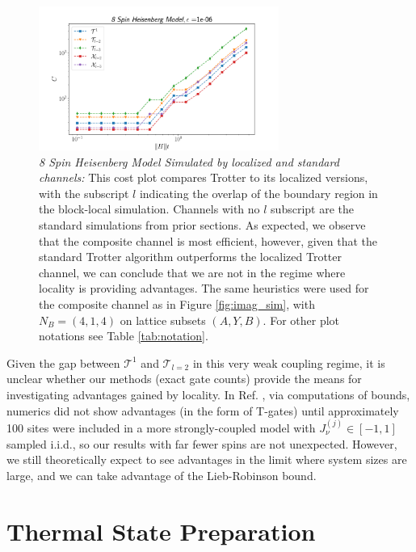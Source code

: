 \begin{figure}[htbp!]
    \centering
    \includegraphics[width=0.7\textwidth]{composite_numerics/local_Heisen8.png}
    \caption{\textit{8 Spin Heisenberg Model Simulated by localized and standard channels:} This cost plot compares Trotter to its  localized versions, with the subscript $l$ indicating the overlap of the boundary region in the block-local simulation.  Channels with no $l$ subscript are the standard simulations from prior sections. As expected, we observe that the composite channel is most efficient, however, given that the standard Trotter algorithm outperforms the localized Trotter channel, we can conclude that we are not in the regime where locality is providing advantages. The same heuristics were used for the composite channel as in Figure \ref{fig:imag_sim}, with $N_B = (4,1,4)$ on lattice subsets $(A, Y, B)$. For other plot notations see Table \ref{tab:notation}.} \label{fig:local_heisen}
\end{figure} 
\FloatBarrier

Given the gap between $\mathcal{T}^1$ and $\mathcal{T}_{l=2}$ in this very weak coupling regime, it is unclear whether our methods (exact gate counts) provide the means for investigating advantages gained by locality. In Ref. \cite{haah2021quantum}, via computations of bounds, numerics did not show advantages (in the form of T-gates) until approximately 100 sites were included in a more strongly-coupled model with $J_\nu^{(j)} \in [-1, 1]$ sampled i.i.d., so our results with far fewer spins are not unexpected. However, we still theoretically expect to see advantages in the limit where system sizes are large, and we can take advantage of the Lieb-Robinson bound.

\section{Thermal State Preparation}


